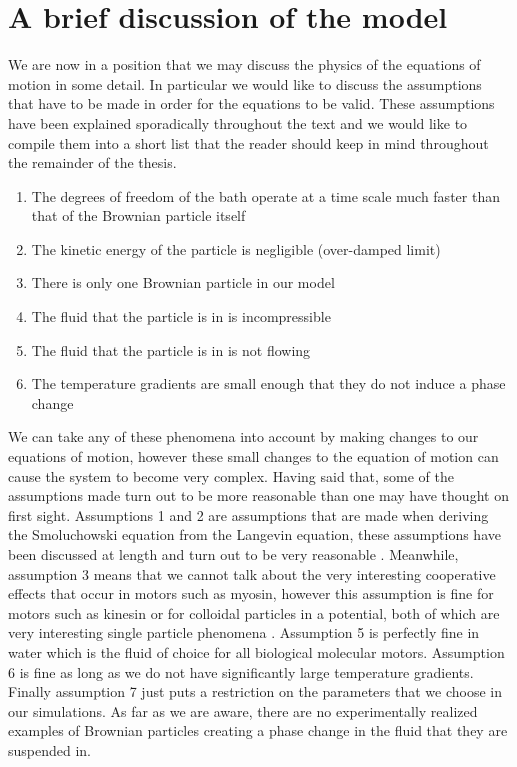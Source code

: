 \section{A brief discussion of the model}
We are now in a position that we may discuss the physics of the equations of motion in some detail. In particular we would like to discuss the assumptions that have to be made in order for the equations to be valid. These assumptions have been explained sporadically throughout the text and we would like to compile them into a short list that the reader should keep in mind throughout the remainder of the thesis.
\begin{enumerate}
\item{The degrees of freedom of the bath operate at a time scale much faster than that of the Brownian particle itself}
\item{The kinetic energy of the particle is negligible (over-damped limit)}
\item{There is only one Brownian particle in our model}
\item{The fluid that the particle is in is incompressible}
\item{The fluid that the particle is in is not flowing}
\item{The temperature gradients are small enough that they do not induce a phase change}
\end{enumerate}
We can take any of these phenomena into account by making changes to our equations of motion, however these small changes to the equation of motion can cause the system to become very complex. Having said that, some of the assumptions made turn out to be more reasonable than one may have thought on first sight. Assumptions 1 and 2 are assumptions that are made when deriving the Smoluchowski equation from the Langevin equation, these assumptions have been discussed at length and turn out to be very reasonable \cite{Reimann2001,Gardiner2009,Einstein1905,KellerBustamante2000,Kramers1940}. Meanwhile, assumption 3 means that we cannot talk about the very interesting cooperative effects that occur in motors such as myosin, however this assumption is fine for motors such as kinesin or for colloidal particles in a potential, both of which are very interesting single particle phenomena \cite{Leibler1993}. Assumption 5 is perfectly fine in water which is the fluid of choice for all biological molecular motors. Assumption 6 is fine as long as we do not have significantly large temperature gradients. Finally assumption 7 just puts a restriction on the parameters that we choose in our simulations. As far as we are aware, there are no experimentally realized examples of Brownian particles creating a phase change in the fluid that they are suspended in.





